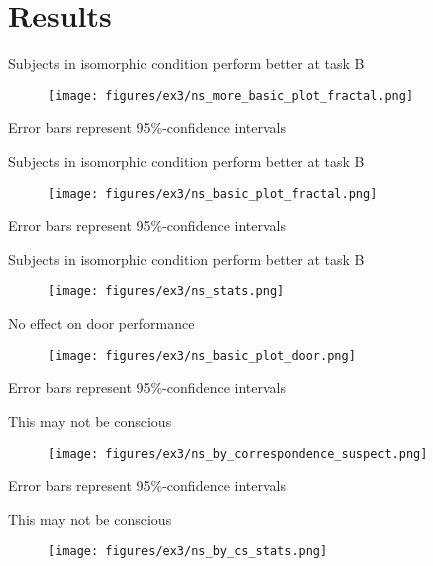 \documentclass{beamer}
\begin{document}
\section{Results}
\begin{frame}{Subjects in isomorphic condition perform better at task B}
\begin{figure}
\centering
\texttt{[image: figures/ex3/ns\_more\_basic\_plot\_fractal.png]}
\end{figure}
{\scriptsize Error bars represent 95\%-confidence intervals}
\end{frame}

\begin{frame}{Subjects in isomorphic condition perform better at task B}
\begin{figure}
\centering
\texttt{[image: figures/ex3/ns\_basic\_plot\_fractal.png]}
\end{figure}
{\scriptsize Error bars represent 95\%-confidence intervals}
\end{frame}

\begin{frame}{Subjects in isomorphic condition perform better at task B}
\begin{figure}
\centering
\texttt{[image: figures/ex3/ns\_stats.png]}
\end{figure}
\end{frame}


\begin{frame}{No effect on door performance}
\begin{figure}
\centering
\texttt{[image: figures/ex3/ns\_basic\_plot\_door.png]}
\end{figure}
{\scriptsize Error bars represent 95\%-confidence intervals}
\end{frame}

\begin{frame}{This may not be conscious}
\begin{figure}
\centering
\texttt{[image: figures/ex3/ns\_by\_correspondence\_suspect.png]}
\end{figure}
\vspace{-5pt}
{\scriptsize Error bars represent 95\%-confidence intervals}
\end{frame}

\begin{frame}{This may not be conscious}
\begin{figure}
\centering
\texttt{[image: figures/ex3/ns\_by\_cs\_stats.png]}
\end{figure}
\end{frame}
\end{document}
